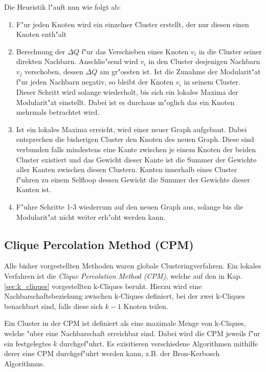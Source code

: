 \documentclass[journal]{vgtc}
\begin{document}
    Die Heuristik l"auft nun wie folgt ab:
    \begin{enumerate}
      \item F"ur jeden Knoten wird ein einzelner Cluster erstellt, der nur diesen einen Knoten enth"alt
      \item Berechnung der $\Delta Q$ f"ur das Verschieben eines Knoten $v_i$ in die Cluster seiner 
      		direkten Nachbarn. Anschlie"send wird $v_i$ in den Cluster desjenigen Nachbarn $v_j$ verschoben,
      		dessen $\Delta Q$ am gr"ossten ist. Ist die Zunahme der Modularit"at f"ur jeden Nachbarn negativ,
      		so bleibt der Knoten $v_i$ in seinem Cluster. Dieser Schritt wird solange wiederholt, bis sich
      		ein lokales Maxima der Modularit"at einstellt. Dabei ist es durchaus m"oglich das ein Knoten
      		mehrmals betrachtet wird.
      \item Ist ein lokales Maxima erreicht, wird einer neuer Graph aufgebaut. Dabei entsprechen die bisherigen
      		Cluster den Knoten des neuen Graph. Diese sind verbunden falls mindestens eine Kante zwischen
      		je einem Knoten der beiden Cluster existiert und das Gewicht dieser Kante ist die Summer
      		der Gewichte aller Kanten zwischen diesen Clustern. Kanten innerhalb eines Cluster f"uhren zu einem
      		Selfloop dessen Gewicht die Summer der Gewichte dieser Kanten ist. 
      \item F"uhre Schritte 1-3 wiederrum auf den neuen Graph aus, solange bis die Modularit"at nicht
      		weiter erh"oht werden kann.
    \end{enumerate}
    
  \subsection{Clique Percolation Method (CPM)}
    \label{sec:CPM}
    Alle bisher vorgestellten Methoden waren globale Clusteringverfahren. Ein lokales Verfahren ist die
    \emph{Clique Percolation Method (CPM)}\cite{CPM}, welche auf den in Kap. \ref{sec:k_cliques}
    vorgestellten k-Cliques beruht. Hierzu wird eine Nachbarschaftsbeziehung zwischen k-Cliques definiert, 
    bei der zwei k-Cliques benachbart sind, falls diese sich $k-1$ Knoten teilen. 
    
    Ein Cluster in der CPM ist definiert als eine maximale Menge von k-Cliques, welche "uber eine Nachbarschaft
    erreichbar sind. Dabei wird die CPM jeweils f"ur ein festgelegtes $k$ durchgef"uhrt. Es exisitieren 
    verschiedene Algorithmen mithilfe derer eine CPM durchgef"uhrt werden kann, z.B. der Bron-Kerbosch Algorithmus.
    
\end{document}
